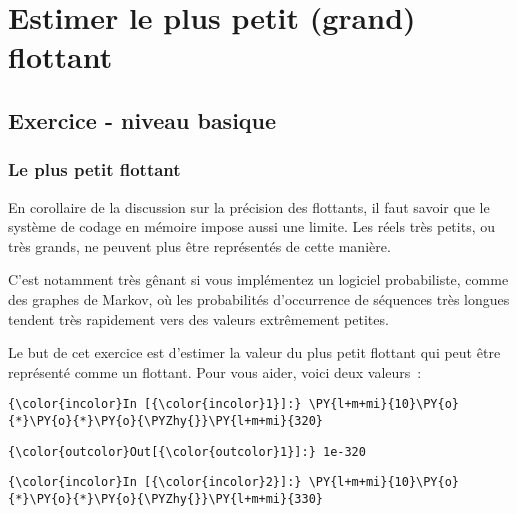     
    
    
    

    

    \hypertarget{estimer-le-plus-petit-grand-flottant}{%
\section{Estimer le plus petit (grand)
flottant}\label{estimer-le-plus-petit-grand-flottant}}

    \hypertarget{exercice---niveau-basique}{%
\subsection{Exercice - niveau basique}\label{exercice---niveau-basique}}

    \hypertarget{le-plus-petit-flottant}{%
\subsubsection{Le plus petit flottant}\label{le-plus-petit-flottant}}

    En corollaire de la discussion sur la précision des flottants, il faut
savoir que le système de codage en mémoire impose aussi une limite. Les
réels très petits, ou très grands, ne peuvent plus être représentés de
cette manière.

C'est notamment très gênant si vous implémentez un logiciel
probabiliste, comme des graphes de Markov, où les probabilités
d'occurrence de séquences très longues tendent très rapidement vers des
valeurs extrêmement petites.

    Le but de cet exercice est d'estimer la valeur du plus petit flottant
qui peut être représenté comme un flottant. Pour vous aider, voici deux
valeurs~:

    \begin{Verbatim}[commandchars=\\\{\}]
{\color{incolor}In [{\color{incolor}1}]:} \PY{l+m+mi}{10}\PY{o}{*}\PY{o}{*}\PY{o}{\PYZhy{}}\PY{l+m+mi}{320}
\end{Verbatim}


\begin{Verbatim}[commandchars=\\\{\}]
{\color{outcolor}Out[{\color{outcolor}1}]:} 1e-320
\end{Verbatim}
            
    \begin{Verbatim}[commandchars=\\\{\}]
{\color{incolor}In [{\color{incolor}2}]:} \PY{l+m+mi}{10}\PY{o}{*}\PY{o}{*}\PY{o}{\PYZhy{}}\PY{l+m+mi}{330}
\end{Verbatim}


